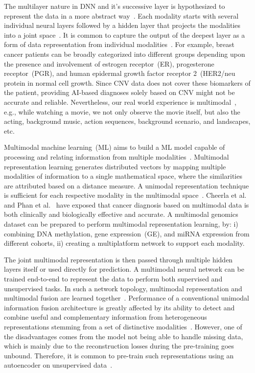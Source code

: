 \hspace*{3.5mm} %
The multilayer nature in DNN and it's successive layer is hypothesized to represent the data in a more abstract way~\cite{mmsurvey}. Each modality starts with several individual neural layers followed by a hidden layer that projects the modalities into a joint space~\cite{serban2016multi}. It is common to capture the output of the deepest layer as a form of data representation from individual modalities~\cite{mmsurvey,serban2016multi}. For example, breast cancer patients can be broadly categorized into different groups depending upon the presence and involvement of estrogen receptor~(ER), progesterone receptor~(PGR), and human epidermal growth factor receptor 2~(HER2/neu protein in normal cell growth. Since CNV data does not cover these biomarkers of the patient, providing AI-based diagnoses solely based on CNV might not be accurate and reliable. Nevertheless, our real world experience is multimodal~\cite{mmsurvey}, e.g., while watching a movie, we not only observe the movie itself, but also the acting, background music, action sequences, background scenario, and landscapes, etc. 

\hspace*{3.5mm} Multimodal machine learning~(ML) aims to build a ML model capable of processing and relating information from multiple modalities~\cite{mmsurvey}. Multimodal representation learning generates distributed vectors by mapping multiple modalities of information to a single mathematical space, where the similarities are attributed based on a distance measure. A unimodal representation technique is sufficient for each respective modality in the multimodal space~\cite{ito2018effects}. Cheerla et al.~\cite{cheerla2019deep} and Phan et al.~\cite{phan2016integration} have exposed that cancer diagnosis based on multimodal data is both clinically and biologically effective and accurate. A multimodal genomics dataset can be prepared to perform multimodal representation learning, by: i) combining DNA methylation, gene expression~(GE), and miRNA expression from different cohorts, ii) creating a multiplatform network to support each modality. 

\hspace*{3.5mm} The joint multimodal representation is then passed through multiple hidden layers itself or used directly for prediction. A multimodal neural network can be trained end-to-end to represent the data to perform both supervised and unsupervised tasks. In such a network topology, multimodal representation and multimodal fusion are learned together~\cite{wang2018associativemulti}. Performance of a conventional unimodal information fusion architecture is greatly affected by its ability to detect and combine useful and complementary information from heterogeneous representations stemming from a set of distinctive modalities~\cite{ito2018effects}. However, one of the disadvantages comes from the model not being able to handle missing data, which is mainly due to the reconstruction losses during the pre-training goes unbound. Therefore, it is common to pre-train such representations using an autoencoder on unsupervised data~\cite{mmsurvey}. 

